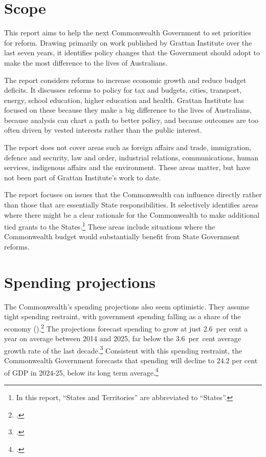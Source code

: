 \documentclass[continuous]{grattan}
\begin{document}
\section{Scope}
This report aims to help the next Commonwealth Government to
set priorities for reform. Drawing primarily on work published by
Grattan Institute over the last seven years, it identifies policy
changes that the Government should adopt to make the most
difference to the lives of Australians.

The report considers reforms to increase economic growth and
reduce budget deficits. It discusses reforms to policy for tax and
budgets, cities, transport, energy, school education, higher
education and health. Grattan Institute has focused on these
because they make a big difference to the lives of Australians,
because analysis can chart a path to better policy, and because
outcomes are too often driven by vested interests rather than the
public interest.

The report does not cover areas such as foreign affairs and trade,
immigration, defence and security, law and order, industrial
relations, communications, human services, indigenous affairs
and the environment. These areas matter, but have not been part
of Grattan Institute’s work to date.

The report focuses on issues that the Commonwealth can
influence directly rather than those that are essentially State
responsibilities. It selectively identifies areas where there might be
a clear rationale for the Commonwealth to make additional tied
grants to the States.\footnote{In this report, “States and Territories” are abbreviated to “States”.} 
These areas include situations where the Commonwealth budget would substantially benefit from State
Government reforms.


\section{Spending projections}
The Commonwealth’s spending projections also seem optimistic. They assume tight spending restraint, with government spending falling as a share of the economy ().\footcite[][5--11]{Treasury2015BudgetPapers201516}  The projections forecast spending to grow at just 2.6~per cent a year on average between 2014 and 2025, far below the 3.6~per~cent average growth rate of the last decade.\footcite[][5]{PBO2015}  Consistent with this spending restraint, the Commonwealth Government forecasts that spending will decline to 24.2 per cent of GDP in 2024-25, below its long term average.\footcite[][3--9]{Treasury2015BudgetPapers201516}  
\end{document}
